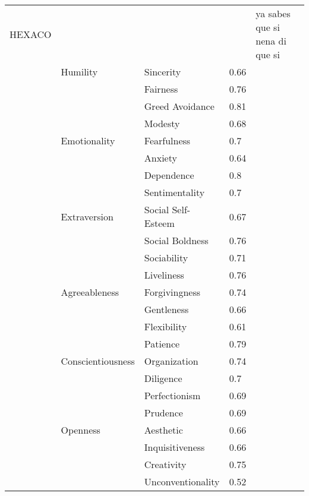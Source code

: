 \documentclass[]{article}
\begin{document}
\begin{longtable}{@{\extracolsep{\fill}}*5{l}}
         HEXACO&                    &                        &             &     ya sabes que si nena di que si    \\
             & Humility           & Sincerity              & 0.66        &         \\
             &                    & Fairness               & 0.76        &         \\
             &                    & Greed Avoidance        & 0.81        &         \\
             &                    & Modesty                & 0.68        &         \\
             & Emotionality       & Fearfulness            & 0.7         &         \\
             &                    & Anxiety                & 0.64        &         \\
             &                    & Dependence             & 0.8         &         \\
             &                    & Sentimentality         & 0.7         &         \\
             & Extraversion       & Social Self-Esteem     & 0.67        &         \\
             &                    & Social Boldness        & 0.76        &         \\
             &                    & Sociability            & 0.71        &         \\
             &                    & Liveliness             & 0.76        &         \\
             & Agreeableness      & Forgivingness          & 0.74        &         \\
             &                    & Gentleness             & 0.66        &         \\
             &                    & Flexibility            & 0.61        &         \\
             &                    & Patience               & 0.79        &         \\
             & Conscientiousness  & Organization           & 0.74        &         \\
             &                    & Diligence              & 0.7         &         \\
             &                    & Perfectionism          & 0.69        &         \\
             &                    & Prudence               & 0.69        &         \\
             & Openness           & Aesthetic              & 0.66        &         \\
             &                    & Inquisitiveness        & 0.66        &         \\
             &                    & Creativity             & 0.75        &         \\
             &                    & Unconventionality      & 0.52        &         \\[1cm]
             


\end{longtable}
\end{document}

